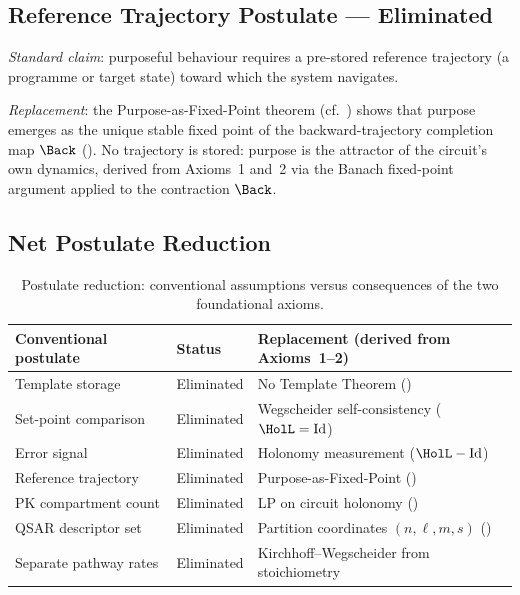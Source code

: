 \subsection{Reference Trajectory Postulate — Eliminated}

\emph{Standard claim}: purposeful behaviour requires a pre-stored reference
trajectory (a programme or target state) toward which the system navigates.

\emph{Replacement}: the Purpose-as-Fixed-Point theorem (cf.\
) shows that purpose emerges as the unique stable
fixed point of the backward-trajectory completion map $\Back$
().  No trajectory is stored: purpose is the
attractor of the circuit's own dynamics, derived from Axioms~1 and~2 via
the Banach fixed-point argument applied to the contraction $\Back$.

\subsection{Net Postulate Reduction}

\begin{table}[!htbp]
\centering
\caption{Postulate reduction: conventional assumptions versus consequences of
the two foundational axioms.}
\label{tab:postulate-reduction}
\begin{tabular}{@{}p{3.8cm}p{3.8cm}p{4.5cm}@{}}
\toprule
Conventional postulate & Status & Replacement (derived from Axioms~1--2) \\
\midrule
Template storage       & Eliminated & No Template Theorem (\Cref{sec:no-template}) \\
Set-point comparison   & Eliminated & Wegscheider self-consistency ($\HolL = \mathrm{Id}$) \\
Error signal           & Eliminated & Holonomy measurement ($\HolL - \mathrm{Id}$) \\
Reference trajectory   & Eliminated & Purpose-as-Fixed-Point (\Cref{ch:coordination}) \\
PK compartment count   & Eliminated & LP on circuit holonomy (\Cref{sec:therapeutic-equation}) \\
QSAR descriptor set    & Eliminated & Partition coordinates $(n,\ell,m,s)$ (\Cref{ch:axioms}) \\
Separate pathway rates & Eliminated & Kirchhoff--Wegscheider from stoichiometry \\
\bottomrule
\end{tabular}
\end{table}

